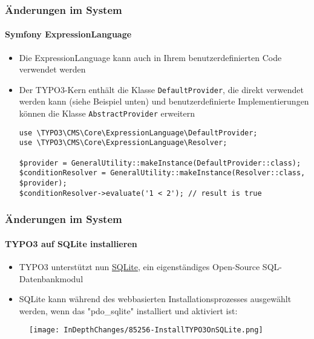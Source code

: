 
\begin{frame}[fragile]
	\frametitle{Änderungen im System}
	\framesubtitle{Symfony ExpressionLanguage}

	\lstset{basicstyle=\tiny\ttfamily}

	\begin{itemize}
		\item Die ExpressionLanguage kann auch in Ihrem benutzerdefinierten Code verwendet werden
		\item Der TYPO3-Kern enthält die Klasse \texttt{DefaultProvider}, die direkt
			verwendet werden kann (siehe Beispiel unten) und benutzerdefinierte Implementierungen
			können die Klasse \texttt{AbstractProvider} erweitern

\begin{lstlisting}
use \TYPO3\CMS\Core\ExpressionLanguage\DefaultProvider;
use \TYPO3\CMS\Core\ExpressionLanguage\Resolver;

$provider = GeneralUtility::makeInstance(DefaultProvider::class);
$conditionResolver = GeneralUtility::makeInstance(Resolver::class, $provider);
$conditionResolver->evaluate('1 < 2'); // result is true
\end{lstlisting}

	\end{itemize}

\end{frame}


\begin{frame}[fragile]
	\frametitle{Änderungen im System}
	\framesubtitle{TYPO3 auf SQLite installieren}

	\begin{itemize}
		\item TYPO3 unterstützt nun \href{https://www.sqlite.org}{SQLite},
			ein eigenständiges Open-Source SQL-Datenbankmodul
		\item SQLite kann während des webbasierten Installationsprozesses ausgewählt werden,
			wenn das "pdo\_sqlite" installiert und aktiviert ist:
	\end{itemize}

	\begin{figure}
		\texttt{[image: InDepthChanges/85256-InstallTYPO3OnSQLite.png]}
	\end{figure}

\end{frame}

